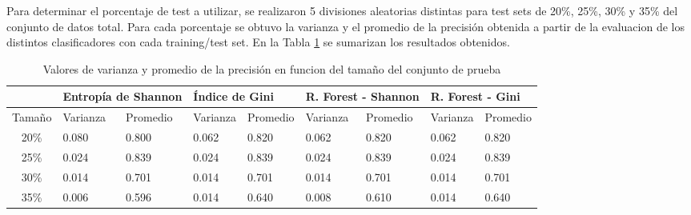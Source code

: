 \documentclass[a4paper]{article}
\begin{document}
Para determinar el porcentaje de test a utilizar, se realizaron 5 divisiones aleatorias distintas para test sets de 20\%, 25\%, 30\% y 35\% del conjunto de datos total. Para cada porcentaje se obtuvo la varianza y el promedio de la precisión obtenida a partir de la evaluacion de los distintos clasificadores con cada training/test set. En la Tabla \ref{tab:testset-summary} se sumarizan los resultados obtenidos.

\begin{table}[h]
  \centering
  \begin{tabular}{@{}cllllllll@{}}
  \toprule
  \multicolumn{1}{l}{}       & \multicolumn{2}{l}{Entropía de Shannon} & \multicolumn{2}{l}{Índice de Gini} & \multicolumn{2}{l}{R. Forest - Shannon} & \multicolumn{2}{l}{R. Forest - Gini} \\ \midrule
  \multicolumn{1}{l}{Tamaño} & Varianza           & Promedio           & Varianza         & Promedio        & Varianza           & Promedio           & Varianza          & Promedio         \\
  20\%                       & 0.080              & 0.800              & 0.062            & 0.820           & 0.062              & 0.820              & 0.062             & 0.820            \\
  25\%                       & 0.024              & 0.839              & 0.024            & 0.839           & 0.024              & 0.839              & 0.024             & 0.839            \\
  30\%                       & 0.014              & 0.701              & 0.014            & 0.701           & 0.014              & 0.701              & 0.014             & 0.701            \\
  35\%                       & 0.006              & 0.596              & 0.014            & 0.640           & 0.008              & 0.610              & 0.014             & 0.640            \\ \bottomrule
  \end{tabular}
  \caption{Valores de varianza y promedio de la precisión en funcion del tamaño del conjunto de prueba}
  \label{tab:testset-summary}
  \end{table}
\end{document}
